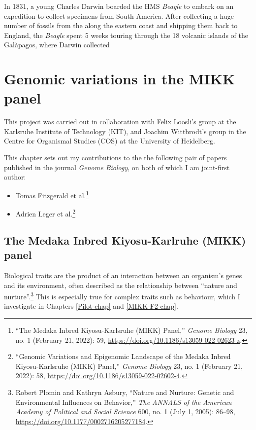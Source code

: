 \documentclass[
  9pt,
]{book}
\begin{document}
In 1831, a young Charles Darwin boarded the HMS \emph{Beagle} to embark on an expedition to collect specimens from South America. After collecting a huge number of fossils from the along the eastern coast and shipping them back to England, the \emph{Beagle} spent 5 weeks touring through the 18 volcanic islands of the Galàpagos, where Darwin collected

\hypertarget{MIKK-genomes-chap}{%
\chapter{Genomic variations in the MIKK panel}\label{MIKK-genomes-chap}}

This project was carried out in collaboration with Felix Loosli's group at the Karlsruhe Institute of Technology (KIT), and Joachim Wittbrodt's group in the Centre for Organismal Studies (COS) at the University of Heidelberg.

This chapter sets out my contributions to the the following pair of papers published in the journal \emph{Genome Biology}, on both of which I am joint-first author:

\begin{itemize}
\item
  Tomas Fitzgerald et al.\footnote{{``The {Medaka Inbred Kiyosu-Karlsruhe} ({MIKK}) Panel,''} \emph{Genome Biology} 23, no. 1 (February 21, 2022): 59, \url{https://doi.org/10.1186/s13059-022-02623-z}.}
\item
  Adrien Leger et al.\footnote{{``Genomic Variations and Epigenomic Landscape of the {Medaka Inbred Kiyosu-Karlsruhe} ({MIKK}) Panel,''} \emph{Genome Biology} 23, no. 1 (February 21, 2022): 58, \url{https://doi.org/10.1186/s13059-022-02602-4}.}
\end{itemize}

\hypertarget{the-medaka-inbred-kiyosu-karlruhe-mikk-panel}{%
\section{The Medaka Inbred Kiyosu-Karlruhe (MIKK) panel}\label{the-medaka-inbred-kiyosu-karlruhe-mikk-panel}}

Biological traits are the product of an interaction between an organism's genes and its environment, often described as the relationship between ``nature and nurture''.\footnote{Robert Plomin and Kathryn Asbury, {``Nature and {Nurture}: {Genetic} and {Environmental Influences} on {Behavior},''} \emph{The ANNALS of the American Academy of Political and Social Science} 600, no. 1 (July 1, 2005): 86--98, \url{https://doi.org/10.1177/0002716205277184}.} This is especially true for complex traits such as behaviour, which I investigate in Chapters \ref{Pilot-chap} and \ref{MIKK-F2-chap}.
\end{document}
